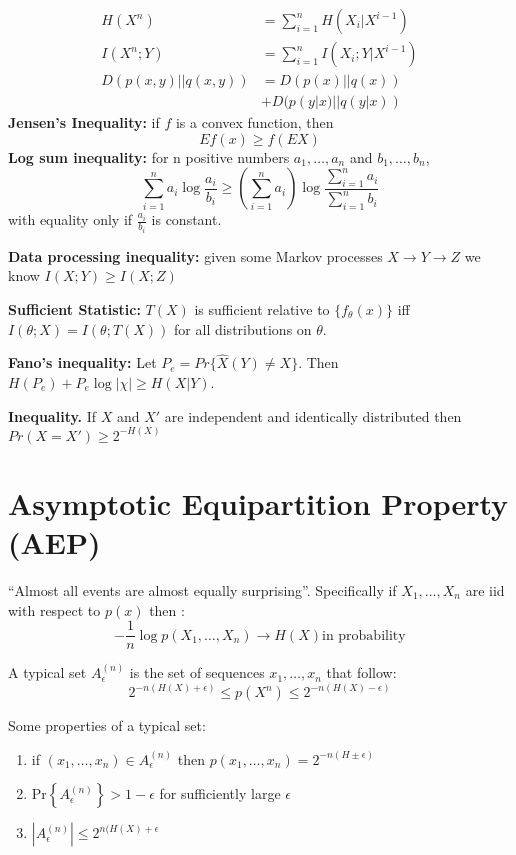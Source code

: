 \documentclass[10pt]{article}
\begin{document}
\begin{scriptsize}
\begin{multicols}{3}
\begin{align}
H(X^n)&=\sum_{i=1}^n H(X_i|X^{i-1})\\
I(X^n;Y)&=\sum_{i=1}^n I(X_i;Y|X^{i-1})\\
D(p(x,y)||q(x,y))&=D(p(x)||q(x))\\
&+D(p(y|x)||q(y|x))
\end{align}
{\bf Jensen's Inequality:} if $f$ is a convex function, then
\begin{equation}
Ef(x) \geq f(EX)
\end{equation}
{\bf Log sum inequality:} for n positive numbers $a_1,\ldots,a_n$ and $b_1,\ldots,b_n$,
\begin{equation}
\sum_{i=1}^n a_i \log \frac{a_i}{b_i} \geq \left( \sum_{i=1}^n a_i \right) \log \frac{\sum_{i=1}^n a_i}{\sum_{i=1}^n b_i}
\end{equation}
with equality only if $\frac{a_i}{b_i}$ is constant. 

{\bf Data processing inequality:} given some Markov processes $X\rightarrow Y\rightarrow Z$ we know $I(X;Y)\geq I(X;Z)$

{\bf Sufficient Statistic:} $T(X)$ is sufficient relative to $\{f_\theta (x)\}$ iff $I(\theta;X)=I(\theta;T(X))$ for all distributions on $\theta$.

{\bf Fano's inequality:} Let $P_e=Pr\{\hat{X}(Y)\neq X\}$. Then $H(P_e)+P_e \log |\chi| \geq H(X|Y)$.

{\bf Inequality.} If $X$ and $X'$ are independent and identically distributed then $Pr(X=X') \geq 2^{-H(X)}$


\section*{Asymptotic Equipartition Property (AEP)}
``Almost all events are almost equally surprising''. Specifically if $X_1,\ldots,X_n$ are iid with respect to $p(x)$ then :
\begin{equation}
-\frac{1}{n}\log p(X_1,\ldots,X_n)\rightarrow H(X) \text{in probability}
\end{equation}

A typical set $A_\epsilon^{(n)}$ is the set of sequences $x_1,\ldots, x_n$ that follow:
\begin{equation}
2^{-n(H(X)+\epsilon)}\leq p(X^n)\leq 2^{-n(H(X)-\epsilon)}
\end{equation}

Some properties of a typical set:
\begin{enumerate}
\item if $(x_1,\ldots,x_n) \in A_\epsilon^{(n)}$ then $p(x_1,\ldots,x_n) = 2^{-n(H\pm \epsilon)}$
\item Pr$\left\{A_\epsilon^{(n)}\right\}>1-\epsilon$ for sufficiently large $\epsilon$
\item $|A_\epsilon^{(n)}| \leq 2^{n(H(X)+\epsilon}$
\end{enumerate}


\end{multicols}
\end{scriptsize}
\end{document}
